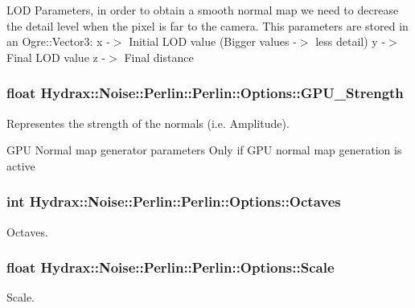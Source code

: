 LOD Parameters, in order to obtain a smooth normal map we need to decrease the detail level when the pixel is far to the camera. This parameters are stored in an Ogre::Vector3: x -$>$ Initial LOD value (Bigger values -$>$ less detail) y -$>$ Final LOD value z -$>$ Final distance \hypertarget{struct_hydrax_1_1_noise_1_1_perlin_1_1_options_2c4f7deaf01fdb818adde19b1174c48d}{
\subsubsection[{GPU\_\-Strength}]{\setlength{\rightskip}{0pt plus 5cm}float Hydrax::Noise::Perlin::Perlin::Options::GPU\_\-Strength}}
\label{struct_hydrax_1_1_noise_1_1_perlin_1_1_options_2c4f7deaf01fdb818adde19b1174c48d}


Representes the strength of the normals (i.e. Amplitude). 

GPU Normal map generator parameters Only if GPU normal map generation is active \hypertarget{struct_hydrax_1_1_noise_1_1_perlin_1_1_options_619c2288fa73c1bae98e475cff6c3e26}{
\subsubsection[{Octaves}]{\setlength{\rightskip}{0pt plus 5cm}int Hydrax::Noise::Perlin::Perlin::Options::Octaves}}
\label{struct_hydrax_1_1_noise_1_1_perlin_1_1_options_619c2288fa73c1bae98e475cff6c3e26}


Octaves. 

\hypertarget{struct_hydrax_1_1_noise_1_1_perlin_1_1_options_06e7bb58600f974065a2d2bdcd6a9f91}{
\subsubsection[{Scale}]{\setlength{\rightskip}{0pt plus 5cm}float Hydrax::Noise::Perlin::Perlin::Options::Scale}}
\label{struct_hydrax_1_1_noise_1_1_perlin_1_1_options_06e7bb58600f974065a2d2bdcd6a9f91}


Scale. 

